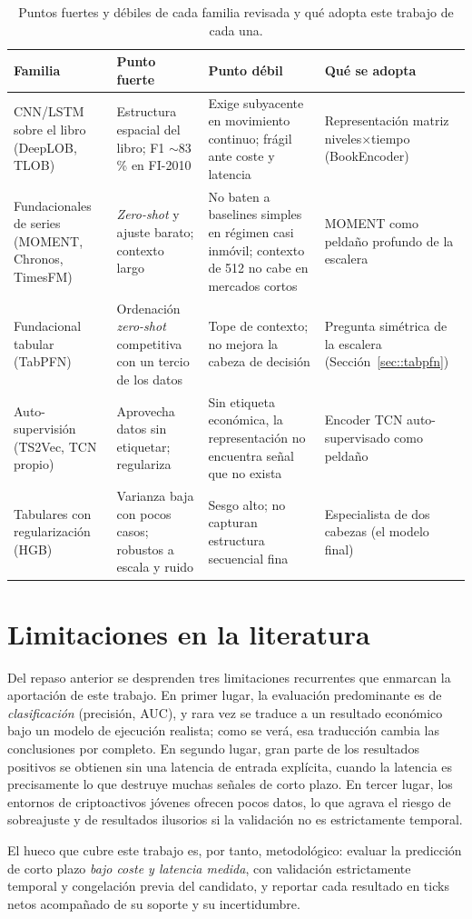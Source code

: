 \begin{table}[htbp]
\centering
\caption[Balance de las familias de modelos revisadas]{Puntos fuertes y débiles de cada
familia revisada y qué adopta este trabajo de cada una.}
\label{tab::familias}
\small
\begin{tabular}{>{\raggedright\arraybackslash}p{}>{\raggedright\arraybackslash}p{}>{\raggedright\arraybackslash}p{}>{\raggedright\arraybackslash}p{}}
\toprule
\textbf{Familia} & \textbf{Punto fuerte} & \textbf{Punto débil} & \textbf{Qué se adopta} \\
\midrule
CNN/LSTM sobre el libro (DeepLOB, TLOB) &
Estructura espacial del libro; F1 $\sim$83\,\% en FI-2010 &
Exige subyacente en movimiento continuo; frágil ante coste y latencia &
Representación matriz niveles$\times$tiempo (BookEncoder) \\
\addlinespace
Fundacionales de series (MOMENT, Chronos, TimesFM) &
\emph{Zero-shot} y ajuste barato; contexto largo &
No baten a baselines simples en régimen casi inmóvil; contexto de 512 no cabe en mercados
cortos &
MOMENT como peldaño profundo de la escalera \\
\addlinespace
Fundacional tabular (TabPFN) &
Ordenación \emph{zero-shot} competitiva con un tercio de los datos &
Tope de contexto; no mejora la cabeza de decisión &
Pregunta simétrica de la escalera (Sección~\ref{sec::tabpfn}) \\
\addlinespace
Auto-supervisión (TS2Vec, TCN propio) &
Aprovecha datos sin etiquetar; regulariza &
Sin etiqueta económica, la representación no encuentra señal que no exista &
Encoder TCN auto-supervisado como peldaño \\
\addlinespace
Tabulares con regularización (HGB) &
Varianza baja con pocos casos; robustos a escala y ruido &
Sesgo alto; no capturan estructura secuencial fina &
Especialista de dos cabezas (el modelo final) \\
\bottomrule
\end{tabular}
\end{table}

\section{Limitaciones en la literatura}

Del repaso anterior se desprenden tres limitaciones recurrentes que enmarcan la aportación
de este trabajo. En primer lugar, la evaluación predominante es de \emph{clasificación}
(precisión, AUC), y rara vez se traduce a un resultado económico bajo un modelo de
ejecución realista; como se verá, esa traducción cambia las conclusiones por completo. En
segundo lugar, gran parte de los resultados positivos se obtienen sin una latencia de
entrada explícita, cuando la latencia es precisamente lo que destruye muchas señales de
corto plazo. En tercer lugar, los entornos de criptoactivos jóvenes ofrecen pocos datos,
lo que agrava el riesgo de sobreajuste y de resultados ilusorios si la validación no es
estrictamente temporal.

El hueco que cubre este trabajo es, por tanto, metodológico: evaluar la predicción de
corto plazo \emph{bajo coste y latencia medida}, con validación estrictamente temporal y
congelación previa del candidato, y reportar cada resultado en ticks netos acompañado de
su soporte y su incertidumbre.
